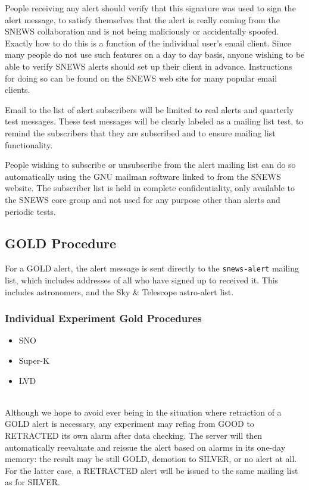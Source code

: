 \documentclass{article}
\begin{document}
People receiving any alert should verify that this signature was used to
sign the alert message, to satisfy themselves that the alert is really
coming from the SNEWS collaboration and is not being maliciously or
accidentally spoofed.  Exactly how to do this is a function of the
individual user's email client.  Since many people do not use such
features on a day to day basis, anyone wishing to be able to verify
SNEWS alerts should set up their client in advance.  Instructions for
doing so can be found on the SNEWS web site for many popular email
clients.  

Email to the list of alert subscribers will be limited to real alerts
and quarterly test messages.  These test messages will be clearly
labeled as a mailing list test, to remind the subscribers that they are
subscribed and to ensure mailing list functionality.

People wishing to subscribe or unsubscribe from the alert mailing list
can do so automatically using the GNU mailman software linked to from
the SNEWS website.  The subscriber list is held in complete
confidentiality, only available to the SNEWS core group and not used for
any purpose other than alerts and periodic tests.

\subsection{GOLD Procedure}\label{GOLD}

For a GOLD alert, the alert message is sent directly to the 
{\tt snews-alert} mailing list, which includes addresses of all
who have signed up to received it. This includes astronomers,
and the Sky \& Telescope astro-alert list. 

\subsubsection{Individual Experiment Gold Procedures}

\begin{itemize}

\item SNO
\item Super-K
\item LVD

\end{itemize}


\\ Although we hope
to avoid ever being in the situation where retraction of a GOLD alert
is necessary, any experiment may reflag from GOOD to RETRACTED its
own alarm after data checking.  The server will then automatically
reevaluate and reissue the alert based on alarms in its one-day
memory: the result may be still GOLD, demotion to SILVER, or no alert
at all.  For the latter case, a RETRACTED alert will be issued to the
same mailing list as for SILVER.
\end{document}
